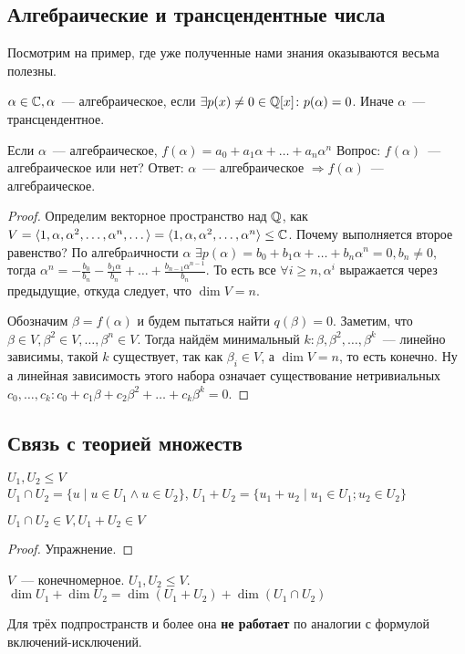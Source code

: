 \subsection{Алгебраические и трансцендентные числа}
\begin{motivation}
    Посмотрим на пример, где уже полученные нами знания оказываются весьма полезны.
\end{motivation} 
\begin{definition}
$\alpha\in\mathbb{C}, \alpha$~--- алгебраическое, если $\exists p(x)\not=0\in\mathbb{Q}[x] \colon p(\alpha)=0$.
Иначе $\alpha$~--- трансцендентное.
\end{definition}
Если $\alpha$~--- алгебраическое, $f(\alpha) = a_0 + a_1\alpha + \dots + a_n\alpha^n$
Вопрос: $f(\alpha)$~--- алгебраическое или нет?
Ответ:
$\alpha$~--- алгебраическое $\Rightarrow f(\alpha)$~--- алгебраическое.
\begin{proof}
    Определим векторное пространство над $\mathbb{Q}$, как $V = \langle1, \alpha, \alpha^2,\dots,\alpha^n,\dots\rangle = \langle1, \alpha, \alpha^2,\dots,\alpha^n\rangle \le \mathbb{C}$.
    Почему выполняется второе равенство?
    По алгебрaичности $\alpha$ $\exists p(\alpha) = b_0+b_1\alpha+\dots+b_n\alpha^n = 0, b_n\not=0$, тогда
    $\alpha^n = -\frac{b_0}{b_n} - \frac{b_1\alpha}{b_n} + \dots + \frac{b_{n-1}\alpha^{n-1}}{b_n}$.
    То есть все $\forall i \ge n, \alpha^i$ выражается через предыдущие, откуда следует, что $\dim V = n$.

    Обозначим $\beta = f(\alpha)$ и будем пытаться найти $q(\beta)=0$.
    Заметим, что $\beta\in V, \beta^2\in V,\dots,\beta^n\in V$. 
    Тогда найдём минимальный $k: \beta,\beta^2,\dots,\beta^k$~--- линейно зависимы, такой $k$ существует,
    так как $\beta_i \in V$, а $\dim V = n$, то есть конечно.
    Ну а линейная зависимость этого набора означает существование нетривиальных 
    $c_0,\dots, c_k\colon c_0 + c_1\beta + c_2\beta^2 + \dots + c_k\beta^k=0$.
\end{proof}
\subsection{Связь с теорией множеств}
\begin{definition}
    $U_1, U_2\leq V$\\
    $U_1\cap U_2 = \{u \mid u\in U_1 \land u\in U_2\}$,
    $U_1+U_2 = \{u_1+u_2\mid u_1\in U_1; u_2\in U_2\}$
\end{definition}
\begin{statement}
    $U_1\cap U_2 \in V, U_1 + U_2 \in V$
\end{statement}
\begin{proof}
    Упражнение.
\end{proof}
\begin{theorem}
$V$~--- конечномерное. $U_1, U_2\leq V$. 
$\dim U_1 + \dim U_2 = \dim(U_1+U_2) + \dim(U_1\cap U_2)$
\end{theorem}
\begin{remark}
Для трёх подпространств и более она \textbf{не работает} по аналогии с формулой включений-исключений.
\end{remark}
